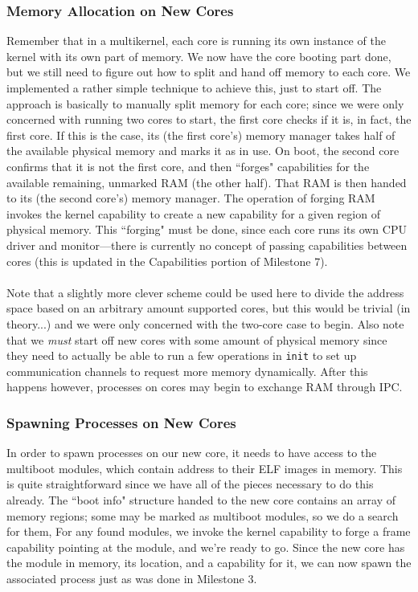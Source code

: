 \subsubsection{Memory Allocation on New Cores}
Remember that in a multikernel, each core is running its own instance of the kernel with its own part of memory. We now have the core booting part done, but we still need to figure out how to split and hand off memory to each core. We implemented a rather simple technique to achieve this, just to start off. The approach is basically to manually split memory for each core; since we were only concerned with running two cores to start, the first core checks if it is, in fact, the first core. If this is the case, its (the first core's) memory manager takes half of the available physical memory and marks it as in use. On boot, the second core confirms that it is not the first core, and then ``forges" capabilities for the available remaining, unmarked RAM (the other half). That RAM is then handed to its (the second core's) memory manager. The operation of forging RAM invokes the kernel capability to create a new capability for a given region of physical memory. This ``forging" must be done, since each core runs its own CPU driver and monitor---there is currently no concept of passing capabilities between cores (this is updated in the Capabilities portion of Milestone 7).
\\\\
Note that a slightly more clever scheme could be used here to divide the address space based on an arbitrary amount supported cores, but this would be trivial (in theory...) and we were only concerned with the two-core case to begin. Also note that we \textit{must} start off new cores with some amount of physical memory since they need to actually be able to run a few operations in \texttt{init} to set up communication channels to request more memory dynamically. After this happens however, processes on cores may begin to exchange RAM through IPC.

\subsubsection{Spawning Processes on New Cores}
In order to spawn processes on our new core, it needs to have access to the multiboot modules, which contain address to their ELF images in memory. This is quite straightforward since we have all of the pieces necessary to do this already. The ``boot info" structure handed to the new core contains an array of memory regions; some may be marked as multiboot modules, so we do a search for them, For any found modules, we invoke the kernel capability to forge a frame capability pointing at the module, and we're ready to go. Since the new core has the module in memory, its location, and a capability for it, we can now spawn the associated process just as was done in Milestone 3.

